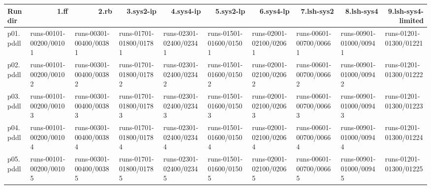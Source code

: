 \documentclass{article}
\begin{document}
\begin{tabular}{@{}lrrrrrrrrr@{}}
Run dir & 1.ff & 2.rb & 3.sys2-ip & 4.sys4-ip & 5.sys2-lp & 6.sys4-lp & 7.lsh-sys2 & 8.lsh-sys4 & 9.lsh-sys4-limited \\
\midrule
p01.pddl & \multicolumn{1}{|l|}{runs-00101-00200/00101} & \multicolumn{1}{|l|}{runs-00301-00400/00381} & \multicolumn{1}{|l|}{runs-01701-01800/01781} & \multicolumn{1}{|l|}{runs-02301-02400/02341} & \multicolumn{1}{|l|}{runs-01501-01600/01501} & \multicolumn{1}{|l|}{runs-02001-02100/02061} & \multicolumn{1}{|l|}{runs-00601-00700/00661} & \multicolumn{1}{|l|}{runs-00901-01000/00941} & \multicolumn{1}{|l|}{runs-01201-01300/01221} \\
p02.pddl & \multicolumn{1}{|l|}{runs-00101-00200/00102} & \multicolumn{1}{|l|}{runs-00301-00400/00382} & \multicolumn{1}{|l|}{runs-01701-01800/01782} & \multicolumn{1}{|l|}{runs-02301-02400/02342} & \multicolumn{1}{|l|}{runs-01501-01600/01502} & \multicolumn{1}{|l|}{runs-02001-02100/02062} & \multicolumn{1}{|l|}{runs-00601-00700/00662} & \multicolumn{1}{|l|}{runs-00901-01000/00942} & \multicolumn{1}{|l|}{runs-01201-01300/01222} \\
p03.pddl & \multicolumn{1}{|l|}{runs-00101-00200/00103} & \multicolumn{1}{|l|}{runs-00301-00400/00383} & \multicolumn{1}{|l|}{runs-01701-01800/01783} & \multicolumn{1}{|l|}{runs-02301-02400/02343} & \multicolumn{1}{|l|}{runs-01501-01600/01503} & \multicolumn{1}{|l|}{runs-02001-02100/02063} & \multicolumn{1}{|l|}{runs-00601-00700/00663} & \multicolumn{1}{|l|}{runs-00901-01000/00943} & \multicolumn{1}{|l|}{runs-01201-01300/01223} \\
p04.pddl & \multicolumn{1}{|l|}{runs-00101-00200/00104} & \multicolumn{1}{|l|}{runs-00301-00400/00384} & \multicolumn{1}{|l|}{runs-01701-01800/01784} & \multicolumn{1}{|l|}{runs-02301-02400/02344} & \multicolumn{1}{|l|}{runs-01501-01600/01504} & \multicolumn{1}{|l|}{runs-02001-02100/02064} & \multicolumn{1}{|l|}{runs-00601-00700/00664} & \multicolumn{1}{|l|}{runs-00901-01000/00944} & \multicolumn{1}{|l|}{runs-01201-01300/01224} \\
p05.pddl & \multicolumn{1}{|l|}{runs-00101-00200/00105} & \multicolumn{1}{|l|}{runs-00301-00400/00385} & \multicolumn{1}{|l|}{runs-01701-01800/01785} & \multicolumn{1}{|l|}{runs-02301-02400/02345} & \multicolumn{1}{|l|}{runs-01501-01600/01505} & \multicolumn{1}{|l|}{runs-02001-02100/02065} & \multicolumn{1}{|l|}{runs-00601-00700/00665} & \multicolumn{1}{|l|}{runs-00901-01000/00945} & \multicolumn{1}{|l|}{runs-01201-01300/01225} \\

\end{tabular}
\end{document}

